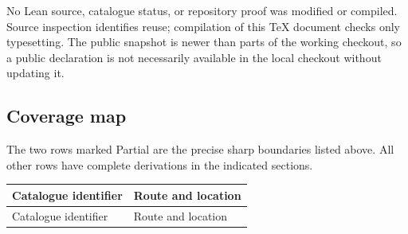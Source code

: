 \documentclass[11pt]{article}
\theoremstyle{remark}
\numberwithin{equation}{section}
\begin{document}
No Lean source, catalogue status, or repository proof was modified or
compiled. Source inspection identifies reuse; compilation of this TeX
document checks only typesetting. The public snapshot is newer than
parts of the working checkout, so a public declaration is not necessarily
available in the local checkout without updating it.

\subsection{Coverage map}
The two rows marked Partial are the precise sharp boundaries listed
above. All other rows have complete derivations in the indicated sections.
\small
\begin{longtable}{@{}p{}p{}@{}}
\toprule
Catalogue identifier & Route and location\\
\midrule
\endfirsthead
\toprule
Catalogue identifier & Route and location\\
\midrule
\endhead


\end{longtable}
\end{document}
